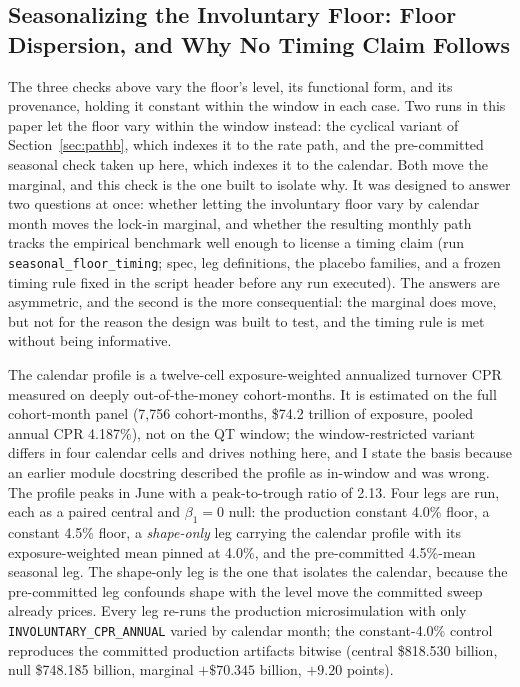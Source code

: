 \documentclass[12pt]{article}
\begin{document}
\subsection{Seasonalizing the Involuntary Floor: Floor Dispersion, and Why No Timing Claim Follows}\label{sec:robustness-seasonalfloor}

The three checks above vary the floor's level, its functional form, and its provenance, holding it constant within the window in each case. Two runs in this paper let the floor vary within the window instead: the cyclical variant of Section~\ref{sec:pathb}, which indexes it to the rate path, and the pre-committed seasonal check taken up here, which indexes it to the calendar. Both move the marginal, and this check is the one built to isolate why. It was designed to answer two questions at once: whether letting the involuntary floor vary by calendar month moves the lock-in marginal, and whether the resulting monthly path tracks the empirical benchmark well enough to license a timing claim (run \texttt{seasonal\_floor\_timing}; spec, leg definitions, the placebo families, and a frozen timing rule fixed in the script header before any run executed). The answers are asymmetric, and the second is the more consequential: the marginal does move, but not for the reason the design was built to test, and the timing rule is met without being informative.

The calendar profile is a twelve-cell exposure-weighted annualized turnover CPR measured on deeply out-of-the-money cohort-months. It is estimated on the full cohort-month panel (7{,}756 cohort-months, \$74.2 trillion of exposure, pooled annual CPR 4.187\%), not on the QT window; the window-restricted variant differs in four calendar cells and drives nothing here, and I state the basis because an earlier module docstring described the profile as in-window and was wrong. The profile peaks in June with a peak-to-trough ratio of 2.13. Four legs are run, each as a paired central and $\beta_1 = 0$ null: the production constant 4.0\% floor, a constant 4.5\% floor, a \emph{shape-only} leg carrying the calendar profile with its exposure-weighted mean pinned at 4.0\%, and the pre-committed 4.5\%-mean seasonal leg. The shape-only leg is the one that isolates the calendar, because the pre-committed leg confounds shape with the level move the committed sweep already prices. Every leg re-runs the production microsimulation with only \texttt{INVOLUNTARY\_CPR\_ANNUAL} varied by calendar month; the constant-4.0\% control reproduces the committed production artifacts bitwise (central \$818.530 billion, null \$748.185 billion, marginal $+\$70.345$ billion, $+9.20$ points).
\end{document}
